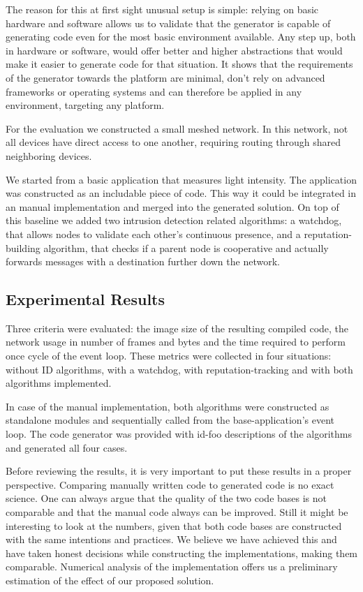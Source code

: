 \documentclass[conference]{IEEEtran}
\newcommand{\NAME}{id-foo\xspace}
\begin{document}
The reason for this at first sight unusual setup is simple: relying on basic
hardware and software allows us to validate that the generator is capable of
generating code even for the most basic environment available. Any step up,
both in hardware or software, would offer better and higher abstractions that
would make it easier to generate code for that situation. It shows that the
requirements of the generator towards the platform are minimal, don't rely on
advanced frameworks or operating systems and can therefore be applied in any
environment, targeting any platform.

For the evaluation we constructed a small meshed network. In this network, not
all devices have direct access to one another, requiring routing through shared
neighboring devices.

We started from a basic application that measures light intensity. The
application was constructed as an includable piece of code. This way it could
be integrated in an manual implementation and merged into the generated
solution. On top of this baseline we added two intrusion detection related
algorithms: a watchdog\cite{mishra2004intrusion}, that allows nodes to validate
each other's continuous presence, and a reputation-building
algorithm\cite{ganeriwal2008reputation}, that checks if a parent node is
cooperative and actually forwards messages with a destination further down the
network.

\subsection*{Experimental Results}

Three criteria were evaluated: the image size of the resulting compiled code,
the network usage in number of frames and bytes and the time required to
perform once cycle of the event loop. These metrics were collected in four
situations: without ID algorithms, with a watchdog, with reputation-tracking
and with both algorithms implemented.

In case of the manual implementation, both algorithms were constructed as
standalone modules and sequentially called from the base-application's event
loop. The code generator was provided with \NAME descriptions of the algorithms
and generated all four cases.

Before reviewing the results, it is very important to put these results in a
proper perspective. Comparing manually written code to generated code is no
exact science. One can always argue that the quality of the two code bases is
not comparable and that the manual code always can be improved. Still it might
be interesting to look at the numbers, given that both code bases are
constructed with the same intentions and practices. We believe we have achieved
this and have taken honest decisions while constructing the implementations,
making them comparable. Numerical analysis of the implementation offers us a
preliminary estimation of the effect of our proposed solution.
\end{document}
